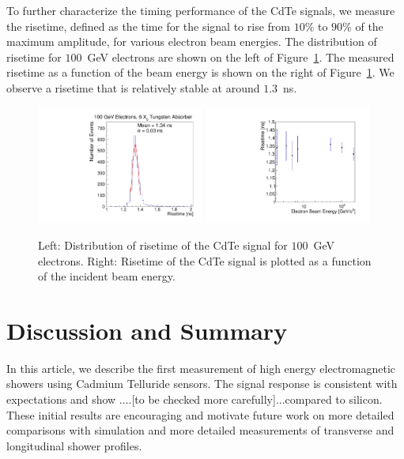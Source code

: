 \documentclass[preprint,1p]{elsarticle}
\begin{document}
To further characterize the timing performance of the CdTe signals, we measure the
risetime, defined as the time for the signal to rise from $10\%$ to $90\%$ of the maximum
amplitude, for various electron beam energies. The distribution of risetime for
$100$~GeV electrons are shown on the left of Figure~\ref{fig:riseTime}. The 
measured risetime as a function of the beam energy is shown on the right of 
Figure~\ref{fig:riseTime}. We observe a risetime that is relatively stable
at around $1.3$~ns.


\begin{figure}[htbp] 
\centering
\includegraphics[width=0.49\textwidth]{figures/100GeV_risetime.pdf} 
\includegraphics[width=0.49\textwidth]{figures/RisetimeVsEnergy.pdf} 
\caption{ Left: Distribution of risetime of the CdTe signal for $100$~GeV electrons. 
Right: Risetime of the CdTe signal is plotted as a function of the incident beam energy. } 
\label{fig:riseTime} 
\end{figure} 




\section{Discussion and Summary}
\label{sec:summary} 


In this article, we describe the first measurement of high energy 
electromagnetic showers using Cadmium Telluride sensors. The signal response
is consistent with expectations and show ....[to be checked more carefully]...compared to silicon.
These initial results are encouraging and motivate future work on 
more detailed comparisons with simulation and more detailed 
measurements of transverse and longitudinal shower profiles.
\end{document}

